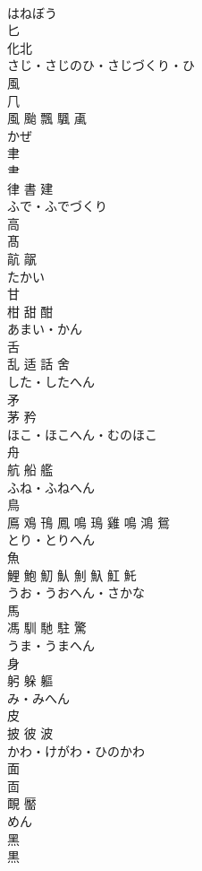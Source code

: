 \documentclass[8pt]{extreport}
\begin{document}
\begin{CJK}{UTF8}{min}
\\	はねぼう	
\\	匕	
\\	化北	
\\	さじ・さじのひ・さじづくり・ひ	
\\	風	
\\	𠘨 
\\	風 颱 飄 颿 颪	
\\	かぜ	
\\	聿	
\\	⺻ 
\\	律 書 建	
\\	ふで・ふでづくり	
\\	高	
\\	髙 
\\	髚 髛	
\\	たかい	
\\	甘	
\\	柑 甜 酣	
\\	あまい・かん	
\\	舌	
\\	乱 适 話 舍	
\\	した・したへん	
\\	矛	
\\	茅 矜	
\\	ほこ・ほこへん・むのほこ	
\\	舟	
\\	航 船 艦	
\\	ふね・ふねへん	
\\	鳥	
\\	鳫 鳮 鳱 鳳 鳴 鳿 雞 鳴 鴻 鴛	
\\	とり・とりへん	
\\	魚	
\\	鯉 鮑 魛 魜 魝 魞 魟 魠	
\\	うお・うおへん・さかな	
\\	馬	
\\	馮 馴 馳 駐 驚	
\\	うま・うまへん	
\\	身	
\\	躬 躲 軀	
\\	み・みへん	
\\	皮	
\\	披 彼 波	
\\	かわ・けがわ・ひのかわ	
\\	面	
\\	靣 
\\	靦 靨	
\\	めん	
\\	黑	
\\	黒 

\end{CJK}
\end{document}
